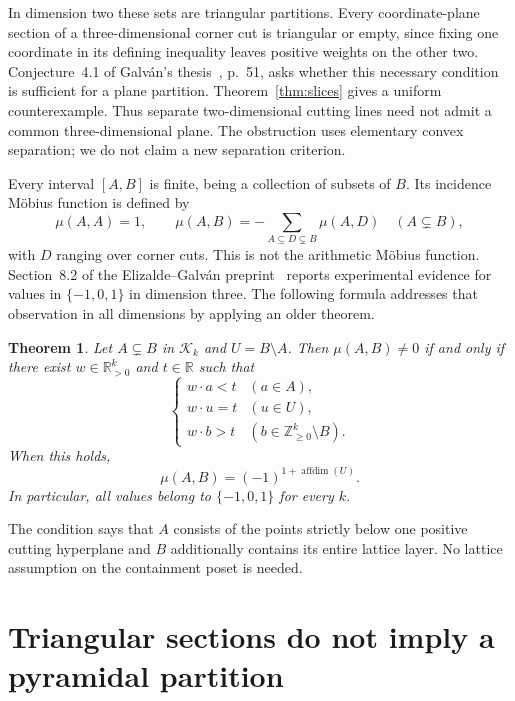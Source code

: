 \documentclass[11pt]{article}
\newtheorem{theorem}{Theorem}
\theoremstyle{remark}
\newcommand{\K}{\mathcal K}
\newcommand{\NN}{\mathbb Z_{\geq0}}
\newcommand{\RR}{\mathbb R}
\newcommand{\affdim}{\operatorname{affdim}}
\begin{document}
In dimension two these sets are triangular partitions. Every coordinate-plane
section of a three-dimensional corner cut is triangular or empty, since fixing
one coordinate in its defining inequality leaves positive weights on the other
two. Conjecture~4.1 of Galv\'an's thesis~\cite{GalvanThesis}, p.~51, asks
whether this necessary condition is sufficient for a plane partition.
Theorem~\ref{thm:slices} gives a uniform counterexample. Thus separate
two-dimensional cutting lines need not admit a common three-dimensional plane.
The obstruction uses elementary convex separation; we do not claim a new
separation criterion.

Every interval $[A,B]$ is finite, being a collection of subsets of $B$.
Its incidence M\"obius function is defined by
\[
 \mu(A,A)=1,\qquad
 \mu(A,B)=-\sum_{A\subseteq D\subsetneq B}\mu(A,D)\quad(A\subsetneq B),
\]
with $D$ ranging over corner cuts. This is not the arithmetic M\"obius function.
Section~8.2 of the Elizalde--Galv\'an preprint~\cite{EG} reports experimental
evidence for values in $\{-1,0,1\}$ in dimension three. The following formula
addresses that observation in all dimensions by applying an older theorem.

\begin{theorem}\label{thm:main}
Let $A\subsetneq B$ in $\K_k$ and $U=B\setminus A$. Then $\mu(A,B)\ne0$
if and only if there exist $w\in\RR_{>0}^k$ and $t\in\RR$ such that
\begin{equation}\label{eq:layer}
 \begin{cases}
 w\cdot a<t & (a\in A),\\
 w\cdot u=t & (u\in U),\\
 w\cdot b>t & (b\in\NN^k\setminus B).
 \end{cases}
\end{equation}
When this holds,
\begin{equation}\label{eq:mu}
 \mu(A,B)=(-1)^{1+\affdim(U)}.
\end{equation}
In particular, all values belong to $\{-1,0,1\}$ for every $k$.
\end{theorem}

The condition says that $A$ consists of the points strictly below one positive
cutting hyperplane and $B$ additionally contains its entire lattice layer.
No lattice assumption on the containment poset is needed.

\section{Triangular sections do not imply a pyramidal partition}
\end{document}
